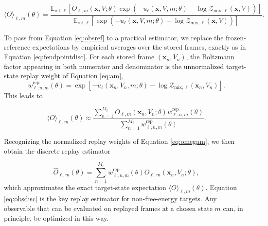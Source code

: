 \begin{equation}
    \langle O \rangle_{\ell,m}(\theta)
    =
    \frac{
        \mathbb{E}_{\mathrm{ref},\ell}
        \left[
            O_{\ell,m}(\mathbf{x}, V; \theta)
            \exp \left(
                -u_\ell(\mathbf{x}, V, m; \theta)
                -
                \log \mathcal{Z}_{\mathrm{mix},\ell}(\mathbf{x}, V)
            \right)
        \right]
    }{
        \mathbb{E}_{\mathrm{ref},\ell}
        \left[
            \exp \left(
                -u_\ell(\mathbf{x}, V, m; \theta)
                -
                \log \mathcal{Z}_{\mathrm{mix},\ell}(\mathbf{x}, V)
            \right)
        \right]
    }.
    \label{eq:obsref}
\end{equation}

To pass from Equation \eqref{eq:obsref} to a practical estimator, we replace the frozen-reference expectations by empirical averages over the stored frames, exactly as in Equation \eqref{eq:fendpointdisc}. For each stored frame $(\mathbf{x}_n, V_n)$, the Boltzmann factor appearing in both numerator and denominator is the unnormalized target-state replay weight of Equation \eqref{eq:am},
%
\[
    w^{\mathrm{rep}}_{\ell,n,m}(\theta)
    =
    \exp\left[
        -u_\ell(\mathbf{x}_n, V_n, m; \theta)
        -
        \log \mathcal{Z}_{\mathrm{mix}, \ell}(\mathbf{x}_n, V_n)
    \right].
\]
%
This leads to

\begin{equation}
    \langle O \rangle_{\ell,m}(\theta)
    \approx
    \frac{
        \sum_{n=1}^{M_\ell}
        O_{\ell,m}(\mathbf{x}_n, V_n; \theta)
        w^{\mathrm{rep}}_{\ell,n,m}(\theta)
    }{
        \sum_{n=1}^{M_\ell}
        w^{\mathrm{rep}}_{\ell,n,m}(\theta)
    }.
    \label{eq:obsdisc_unnorm}
\end{equation}

Recognizing the normalized replay weights of Equation \eqref{eq:omegam}, we then obtain the discrete replay estimator

\begin{equation}
    \widehat{O}_{\ell,m}(\theta)
    =
    \sum_{n=1}^{M_\ell}
    \overline{w}^{\mathrm{rep}}_{\ell,n,m}(\theta)
    O_{\ell,m}(\mathbf{x}_n, V_n; \theta),
    \label{eq:obsdisc}
\end{equation}
%
which approximates the exact target-state expectation $\langle O \rangle_{\ell,m}(\theta)$. Equation \eqref{eq:obsdisc} is the key replay estimator for non-free-energy targets. Any observable that can be evaluated on replayed frames at a chosen state $m$ can, in principle, be optimized in this way.

